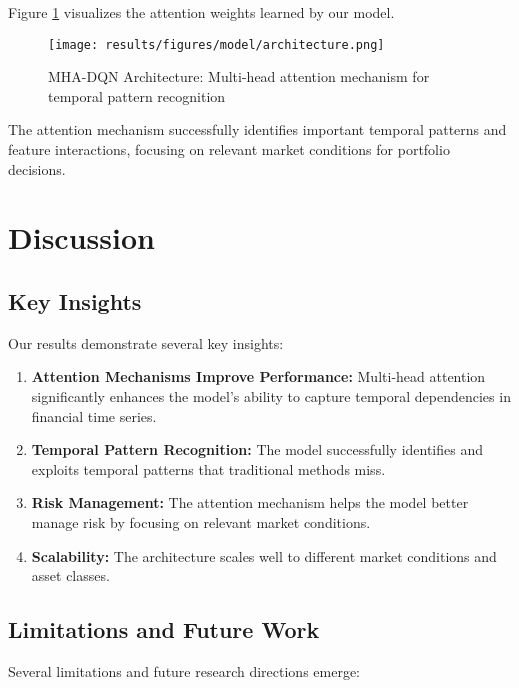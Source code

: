 \documentclass[11pt]{article}
\begin{document}
Figure \ref{fig:attention} visualizes the attention weights learned by our model.

\begin{figure}[h]
\centering
\texttt{[image: results/figures/model/architecture.png]}
\caption{MHA-DQN Architecture: Multi-head attention mechanism for temporal pattern recognition}
\label{fig:attention}
\end{figure}

The attention mechanism successfully identifies important temporal patterns and feature interactions, focusing on relevant market conditions for portfolio decisions.

\section{Discussion}

\subsection{Key Insights}

Our results demonstrate several key insights:

\begin{enumerate}
    \item \textbf{Attention Mechanisms Improve Performance:} Multi-head attention significantly enhances the model's ability to capture temporal dependencies in financial time series.
    
    \item \textbf{Temporal Pattern Recognition:} The model successfully identifies and exploits temporal patterns that traditional methods miss.
    
    \item \textbf{Risk Management:} The attention mechanism helps the model better manage risk by focusing on relevant market conditions.
    
    \item \textbf{Scalability:} The architecture scales well to different market conditions and asset classes.
\end{enumerate}

\subsection{Limitations and Future Work}

Several limitations and future research directions emerge:
\end{document}
